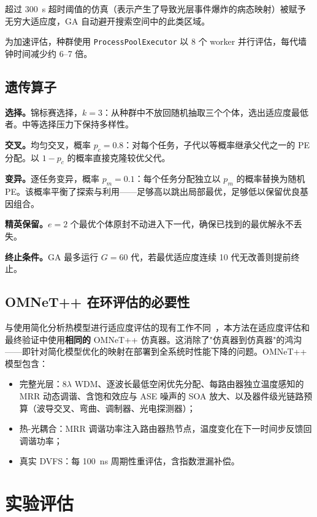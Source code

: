 \documentclass[conference]{IEEEtran}
\begin{document}
超过 \SI{300}{\second} 超时阈值的仿真（表示产生了导致光层事件爆炸的病态映射）被赋予无穷大适应度，GA 自动避开搜索空间中的此类区域。

为加速评估，种群使用 \texttt{ProcessPoolExecutor} 以 8 个 worker 并行评估，每代墙钟时间减少约 6--7 倍。

\subsection{遗传算子}

\textbf{选择。}锦标赛选择，$k = 3$：从种群中不放回随机抽取三个个体，选出适应度最低者。中等选择压力下保持多样性。

\textbf{交叉。}均匀交叉，概率 $p_c = 0.8$：对每个任务，子代以等概率继承父代之一的 PE 分配。以 $1 - p_c$ 的概率直接克隆较优父代。

\textbf{变异。}逐任务变异，概率 $p_m = 0.1$：每个任务分配独立以 $p_m$ 的概率替换为随机 PE。该概率平衡了探索与利用——足够高以跳出局部最优，足够低以保留优良基因组合。

\textbf{精英保留。}$e = 2$ 个最优个体原封不动进入下一代，确保已找到的最优解永不丢失。

\textbf{终止条件。}GA 最多运行 $G = 60$ 代，若最优适应度连续 10 代无改善则提前终止。

\subsection{OMNeT++ 在环评估的必要性}

与使用简化分析热模型进行适应度评估的现有工作不同~\cite{chittamuru2015}，本方法在适应度评估和最终验证中使用\textbf{相同的} OMNeT++ 仿真器。这消除了"仿真器到仿真器"的鸿沟——即针对简化模型优化的映射在部署到全系统时性能下降的问题。OMNeT++ 模型包含：

\begin{itemize}
\item 完整光层：8$\lambda$ WDM、逐波长最低空闲优先分配、每路由器独立温度感知的 MRR 动态调谐、含饱和效应与 ASE 噪声的 SOA 放大、以及器件级光链路预算（波导交叉、弯曲、调制器、光电探测器）；
\item 热-光耦合：MRR 调谐功率注入路由器热节点，温度变化在下一时间步反馈回调谐功率；
\item 真实 DVFS：每 \SI{100}{\nano\second} 周期性重评估，含指数泄漏补偿。
\end{itemize}

\section{实验评估}
\end{document}
